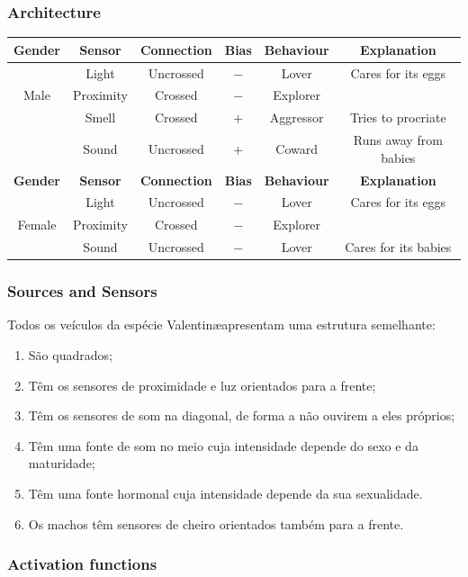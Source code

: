\documentclass[a4paper]{article}
\begin{document}
\subsubsection{Architecture}
\begin{tabular}{| c | c | c | c | c | c |}
 \hline
  \textbf{Gender} & \textbf{Sensor} & \textbf{Connection} & \textbf{Bias} & \textbf{Behaviour} & \textbf{Explanation} \\
 \hline
  & Light & Uncrossed & $-$ & Lover & Cares for its eggs \\
  Male & Proximity & Crossed & $-$ & Explorer &  \\
  & Smell & Crossed & $+$ & Aggressor & Tries to procriate \\
  & Sound & Uncrossed & $+$ & Coward & Runs away from babies \\
 \hline
  \textbf{Gender} & \textbf{Sensor} & \textbf{Connection} & \textbf{Bias} & \textbf{Behaviour} & \textbf{Explanation} \\
 \hline
  & Light & Uncrossed & $-$ & Lover & Cares for its eggs \\
  Female & Proximity & Crossed & $-$ & Explorer &  \\
  & Sound & Uncrossed & $-$ & Lover & Cares for its babies \\
 \hline
\end{tabular}

\subsubsection{Sources and Sensors}
\indent \indent Todos os veículos da espécie Valentin\ae apresentam uma estrutura semelhante:
\begin{enumerate}
\item São quadrados;
\item Têm os sensores de proximidade e luz orientados para a frente;
\item Têm os sensores de som na diagonal, de forma a não ouvirem a eles próprios;
\item Têm uma fonte de som no meio cuja intensidade depende do sexo e da maturidade;
\item Têm uma fonte hormonal cuja intensidade depende da sua sexualidade.
\item Os machos têm sensores de cheiro orientados também para a frente.  
\end{enumerate}

\cleardoublepage
\subsubsection{Activation functions}
\end{document}
